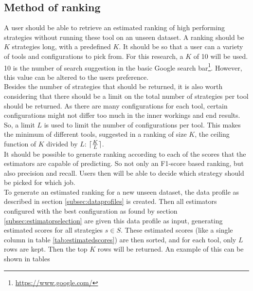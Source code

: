\subsection{Method of ranking}
A user should be able to retrieve an estimated ranking of high performing strategies without running these tool on an unseen dataset. A ranking should be $K$ strategies long, with a predefined $K$. It should be so that a user can a variety of tools and configurations to pick from. For this research, a $K$ of 10 will be used. 10 is the number of search suggestion in the basic Google search bar\footnote{\url{https://www.google.com/}}. However, this value can be altered to the users preference.
\\Besides the number of strategies that should be returned, it is also worth considering that there should be a limit on the total number of strategies per tool should be returned. As there are many configurations for each tool, certain configurations might not differ too much in the inner workings and end results. So, a limit $L$ is used to limit the number of configurations per tool. This makes the minimum of different tools, suggested in a ranking of size $K$, the ceiling function of $K$ divided by $L$: $\lceil\frac{K}{L}\rceil$. 
\\It should be possible to generate ranking according to each of the scores that the estimators are capable of predicting. So not only an F1-score based ranking, but also precision and recall. Users then will be able to decide which strategy should be picked for which job.
\\To generate an estimated ranking for a new unseen dataset, the data profile as described in section \ref{subsec:dataprofiles} is created. Then all estimators configured with the best configuration as found by section \ref{subsec:estimatorselection} are given this data profile as input, generating estimated scores for all strategies $s \in S$. These estimated scores (like a single column in table \ref{tab:estimatedscores}) are then sorted, and for each tool, only $L$ rows are kept. Then the top $K$ rows will be returned. An example of this can be shown in tables 

